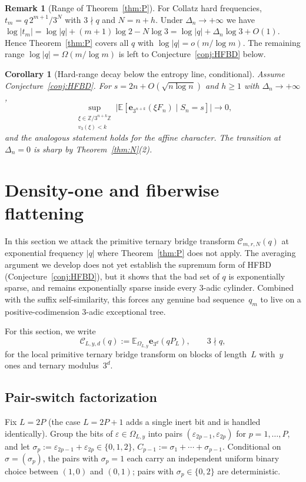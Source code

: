 \documentclass[11pt,a4paper]{amsart}
\theoremstyle{plain}
\newtheorem{corollary}[theorem]{Corollary}
\theoremstyle{definition}
\newtheorem{remark}[theorem]{Remark}
\newcommand{\Z}{\mathbb{Z}}
\newcommand{\E}{\mathbb{E}}
\begin{document}
\begin{remark}[Range of Theorem~\ref{thm:P}]
For Collatz hard frequencies, $t_m=q\,2^{m+1}/3^N$ with $3\nmid q$ and
$N=n+h$.
Under $\Delta_n\to+\infty$ we have
$\log|t_m|=\log|q|+(m+1)\log 2-N\log 3=\log|q|+\Delta_n\log 3+O(1)$.
Hence Theorem~\ref{thm:P} covers all $q$ with $\log|q|=o(m/\log m)$.
The remaining range $\log|q|=\Omega(m/\log m)$ is left to
Conjecture~\ref{conj:HFBD} below.
\end{remark}

\begin{corollary}[Hard-range decay below the entropy line, conditional]\label{cor:cond}
Assume Conjecture~\ref{conj:HFBD}.
For $s=2n+O(\sqrt{n\log n})$ and $h\ge1$ with $\Delta_n\to+\infty$,
$$
\sup_{\substack{\xi\in\Z/3^{n+k}\Z\\v_3(\xi)<k}}
\bigl|\E[\mathbf e_{3^{n+k}}(\xi F_n)\mid S_n=s]\bigr|\to0,
$$
and the analogous statement holds for the affine character.
The transition at $\Delta_n=0$ is sharp by Theorem~\ref{thm:N}(2).
\end{corollary}

\section{Density-one and fiberwise flattening}\label{sec:flatten}

In this section we attack the primitive ternary bridge transform
$\mathcal C_{m,r,N}(q)$ at exponential frequency $|q|$ where
Theorem~\ref{thm:P} does not apply.
The averaging argument we develop does not yet establish the supremum
form of HFBD (Conjecture~\ref{conj:HFBD}), but it shows that the bad set
of $q$ is exponentially sparse, and remains exponentially sparse inside
every $3$-adic cylinder.
Combined with the suffix self-similarity, this forces any genuine bad
sequence~$q_m$ to live on a positive-codimension $3$-adic exceptional
tree.

For this section, we write
$$
\mathcal C_{L,y,d}(q):=\E_{\Omega_{L,y}}\mathbf e_{3^d}(qP_L),\qquad 3\nmid q,
$$
for the local primitive ternary bridge transform on blocks of length~$L$
with~$y$ ones and ternary modulus~$3^d$.

\subsection{Pair-switch factorization}
Fix $L=2P$ (the case $L=2P+1$ adds a single inert bit and is handled
identically).
Group the bits of $\varepsilon\in\Omega_{L,y}$ into pairs
$(\varepsilon_{2p-1},\varepsilon_{2p})$ for $p=1,\dots,P$, and let
$\sigma_p:=\varepsilon_{2p-1}+\varepsilon_{2p}\in\{0,1,2\}$,
$C_{p-1}:=\sigma_1+\cdots+\sigma_{p-1}$.
Conditional on $\sigma=(\sigma_p)$, the pairs with $\sigma_p=1$
each carry an independent uniform binary choice between
$(1,0)$ and $(0,1)$; pairs with $\sigma_p\in\{0,2\}$ are deterministic.
\end{document}
